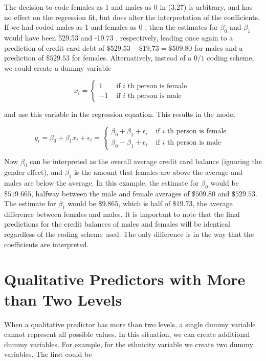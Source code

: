 \documentclass[10pt]{article}
\begin{document}
The decision to code females as 1 and males as 0 in (3.27) is arbitrary, and has no effect on the regression fit, but does alter the interpretation of the coefficients. If we had coded males as 1 and females as 0 , then the estimates for $\beta_{0}$ and $\beta_{1}$ would have been 529.53 and -19.73 , respectively, leading once again to a prediction of credit card debt of $\$ 529.53-\$ 19.73=\$ 509.80$ for males and a prediction of $\$ 529.53$ for females. Alternatively, instead of a $0 / 1$ coding scheme, we could create a dummy variable


$$
x_{i}= \begin{cases}1 & \text { if } i \text { th person is female } \\ -1 & \text { if } i \text { th person is male }\end{cases}
$$

and use this variable in the regression equation. This results in the model

$$
y_{i}=\beta_{0}+\beta_{1} x_{i}+\epsilon_{i}= \begin{cases}\beta_{0}+\beta_{1}+\epsilon_{i} & \text { if } i \text { th person is female } \\ \beta_{0}-\beta_{1}+\epsilon_{i} & \text { if } i \text { th person is male }\end{cases}
$$

Now $\beta_{0}$ can be interpreted as the overall average credit card balance (ignoring the gender effect), and $\beta_{1}$ is the amount that females are above the average and males are below the average. In this example, the estimate for $\beta_{0}$ would be $\$ 519.665$, halfway between the male and female averages of $\$ 509.80$ and $\$ 529.53$. The estimate for $\beta_{1}$ would be $\$ 9.865$, which is half of $\$ 19.73$, the average difference between females and males. It is important to note that the final predictions for the credit balances of males and females will be identical regardless of the coding scheme used. The only difference is in the way that the coefficients are interpreted.

\section*{Qualitative Predictors with More than Two Levels}
When a qualitative predictor has more than two levels, a single dummy variable cannot represent all possible values. In this situation, we can create additional dummy variables. For example, for the ethnicity variable we create two dummy variables. The first could be
\end{document}

